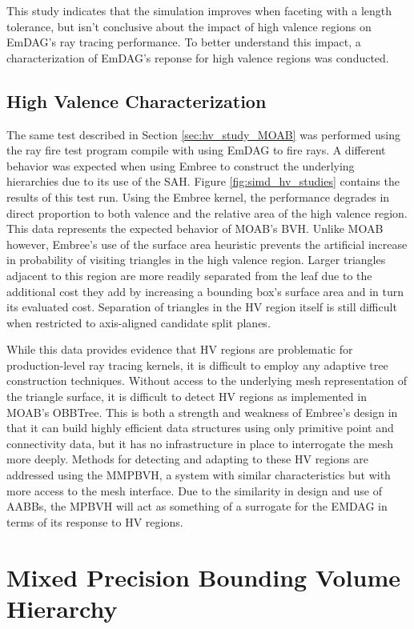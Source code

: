 This study indicates that the simulation improves when faceting with a length
tolerance, but isn't conclusive about the impact of high valence regions on
EmDAG's ray tracing performance. To better understand this impact, a
characterization of EmDAG's reponse for high valence regions was conducted.

\subsection{High Valence Characterization}

The same test described in Section \ref{sec:hv_study_MOAB} was performed
using the ray fire test program compile with using EmDAG to fire rays. A
different behavior was expected when using Embree to construct the underlying
hierarchies due to its use of the SAH. Figure \ref{fig:simd_hv_studies} contains
the results of this test run. Using the Embree kernel, the performance degrades
in direct proportion to both valence and the relative area of the high valence
region. This data represents the expected behavior of MOAB's BVH. Unlike MOAB
however, Embree's use of the surface area heuristic prevents the artificial
increase in probability of visiting triangles in the high valence region. Larger
triangles adjacent to this region are more readily separated from the leaf due
to the additional cost they add by increasing a bounding box's surface area and
in turn its evaluated cost. Separation of triangles in the HV region itself is
still difficult when restricted to axis-aligned candidate split planes.

While this data provides evidence that HV regions are problematic for
production-level ray tracing kernels, it is difficult to employ any adaptive
tree construction techniques. Without access to the underlying mesh
representation of the triangle surface, it is difficult to detect HV regions as
implemented in MOAB's OBBTree. This is both a strength and weakness of Embree's
design in that it can build highly efficient data structures using only
primitive point and connectivity data, but it has no infrastructure in place to
interrogate the mesh more deeply. Methods for detecting and adapting to these HV
regions are addressed using the MMPBVH, a system with similar characteristics
but with more access to the mesh interface. Due to the similarity in design and
use of AABBs, the MPBVH will act as something of a surrogate for the EMDAG in
terms of its response to HV regions.

\section{Mixed Precision Bounding Volume Hierarchy}\label{sec:simd_hv_study}

